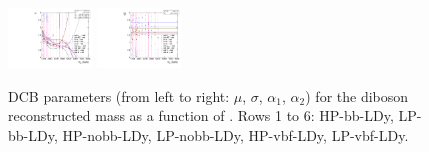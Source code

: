 \begin{figure}[htbp]
  \includegraphics[width=0.2\textwidth]{fig/2Dfit/paramSignalShape_allSig_MVV_LP_vbf_LDy_ALPHA1.pdf}
  \includegraphics[width=0.2\textwidth]{fig/2Dfit/paramSignalShape_allSig_MVV_LP_vbf_LDy_ALPHA2.pdf}\\
  \caption{
    DCB parameters (from left to right: $\mu$, $\sigma$, $\alpha_1$, $\alpha_2$) for the diboson reconstructed mass \MVV as a function of \MX.
    Rows 1 to 6: HP-bb-LDy, LP-bb-LDy, HP-nobb-LDy, LP-nobb-LDy, HP-vbf-LDy, LP-vbf-LDy.
  }
  \label{fig:MVVShapeParam_LDy_Run2}
\end{figure}

